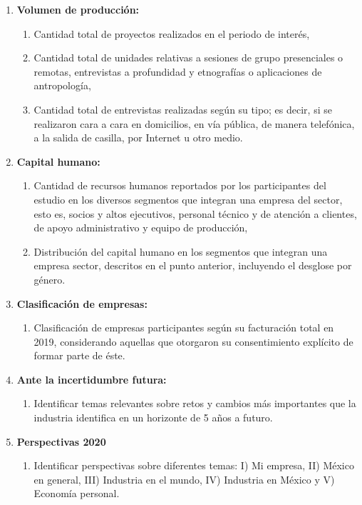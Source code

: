 \begin{enumerate}
    \item \textbf{Volumen de producción:}
        \begin{enumerate}
        \item Cantidad total de proyectos realizados en el periodo de interés,
        \item Cantidad total de unidades relativas a sesiones de grupo presenciales o remotas, entrevistas a profundidad y etnografías o aplicaciones de antropología,
        \item Cantidad total de entrevistas realizadas según su tipo; es decir, si se realizaron cara a cara en domicilios, en vía pública, de manera telefónica, a la salida de casilla, por Internet u otro medio.
        \end{enumerate}
    
    \item \textbf{Capital humano:}
        \begin{enumerate}
        \item Cantidad de recursos humanos reportados por los participantes del estudio en los diversos segmentos que integran una empresa del sector, esto es, socios y altos ejecutivos, personal técnico y de atención a clientes, de apoyo administrativo y equipo de producción,
        \item Distribución del capital humano en los segmentos que integran una empresa sector, descritos en el punto anterior, incluyendo el desglose por género.
        \end{enumerate}
        
    \item \textbf{Clasificación de empresas:}
        \begin{enumerate}
        \item Clasificación de empresas participantes según su facturación total en 2019, considerando aquellas que otorgaron su consentimiento explícito de formar parte de éste.
        \end{enumerate}
    
    \item \textbf{Ante la incertidumbre futura:}
        \begin{enumerate}
        \item Identificar temas relevantes sobre retos y cambios más importantes que la industria identifica en un horizonte de 5 años a futuro.
        \end{enumerate}

    \item \textbf{Perspectivas 2020}
        \begin{enumerate}
        \item Identificar perspectivas sobre diferentes temas: I) Mi empresa, II) México en general, III) Industria en el mundo, IV) Industria en México y V) Economía personal.
        \end{enumerate}

\end{enumerate}

